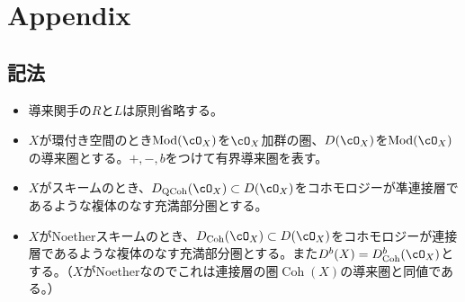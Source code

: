 \documentclass[uplatex, a4paper, dvipdfmx]{jsarticle}
\theoremstyle{definition}
\DeclareMathOperator{\Coh}{\mathrm{Coh}}
\DeclareMathOperator{\QCoh}{\mathrm{QCoh}}
\DeclareMathOperator{\Mod}{\mathrm{Mod}}
\begin{document}
\section{Appendix}
\subsection{記法}
\begin{itemize}
    \item 導来関手の$R$と$L$は原則省略する。
    \item $X$が環付き空間のとき$\Mod(\cO_X)$を$\cO_X$加群の圏、$D(\cO_X)$を$\Mod(\cO_X)$の導来圏とする。$+, -, b$をつけて有界導来圏を表す。
    \item $X$がスキームのとき、$D_{\QCoh}(\cO_X) \subset D(\cO_X)$をコホモロジーが凖連接層であるような複体のなす充満部分圏とする。
    \item $X$がNoetherスキームのとき、$D_{\Coh}(\cO_X) \subset D(\cO_X)$をコホモロジーが連接層であるような複体のなす充満部分圏とする。また$D^b(X) = D_{\Coh}^b(\cO_X)$とする。（$X$がNoetherなのでこれは連接層の圏$\Coh(X)$の導来圏と同値である。）
\end{itemize}
\end{document}
